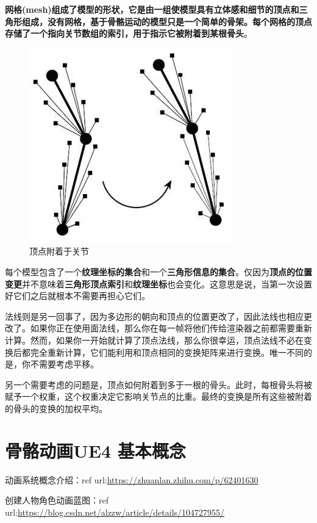 \documentclass[UTF8,a4paper,12pt]{ctexbook}
\begin{document}
				\textbf{网格(mesh)组成了模型的形状，它是由一组使模型具有立体感和细节的顶点和三角形组成，没有网格，基于骨骼运动的模型只是一个简单的骨架。每个网格的顶点存储了一个指向关节数组的索引，用于指示它被附着到某根骨头}。
					\begin{figure}[H]
						\centering
						\includegraphics[width=.6\linewidth]{SkeletonTheory05}
						\caption{顶点附着于关节}
					\end{figure}
				
				每个模型包含了一个\textbf{纹理坐标的集合}和一个\textbf{三角形信息的集合}。仅因为\textbf{顶点的位置变更}并不意味着\textbf{三角形顶点索引}和\textbf{纹理坐标}也会变化。这意思是说，当第一次设置好它们之后就根本不需要再担心它们。
				
				法线则是另一回事了，因为多边形的朝向和顶点的位置更改了，因此法线也相应更改了。如果你正在使用面法线，那么你在每一帧将他们传给渲染器之前都需要重新计算。然而，如果你一开始就计算了顶点法线，那么你很幸运，顶点法线不必在变换后都完全重新计算，它们能利用和顶点相同的变换矩阵来进行变换。唯一不同的是，你不需要考虑平移。
				
				另一个需要考虑的问题是，顶点如何附着到多于一根的骨头。此时，每根骨头将被赋予一个权重，这个权重决定它影响关节点的比重。最终的变换是所有这些被附着的骨头的变换的加权平均。
	

	\section{骨骼动画UE4 基本概念}
			动画系统概念介绍：ref url:\url{https://zhuanlan.zhihu.com/p/62401630}
			
			创建人物角色动画蓝图：ref url:\url{https://blog.csdn.net/alzzw/article/details/104727955/}
			
\end{document}
